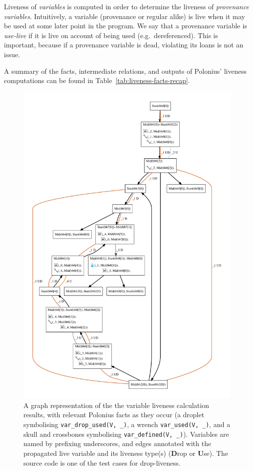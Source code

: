 \documentclass[11pt,a4paper,twoside,openany]{report}
\newcommand{\InDatalog}[1]{\texttt{#1}}
\begin{document}
Liveness of \emph{variables} is computed in order to determine the liveness of
\emph{provenance variables}. Intuitively, a variable (provenance or regular
alike) is live when it may be used at some later point in the program. We say
that a provenance variable is \textit{use-live} if it is live on account of
being used (e.g.\ dereferenced). This is important, because if a provenance
variable is dead, violating its loans is not an issue.

A summary of the facts, intermediate relations, and outputs of Polonius'
liveness computations can be found in Table~\ref{tab:liveness-facts-recap}.

\begin{figure}
  \includegraphics[width=0.9\linewidth]{Graphs/liveness.pdf}
  \caption[MIR Fragment with Inputs and Outputs of the Liveness Analysis]{A
    graph representation of the the variable liveness calculation results, with
    relevant Polonius facts as they occur (a droplet symbolising
    \InDatalog{var_drop_used(V, _)}, a wrench \InDatalog{var_used(V, _)}, and a
    skull and crossbones symbolising \InDatalog{var_defined(V, _)}). Variables
    are named by prefixing underscores, and edges annotated with the propagated
    live variable and its liveness type(s) (\textbf{D}rop or \textbf{U}se). The
    source code is one of the test cases for drop-liveness.}\label{fig:liveness-graph}
\end{figure}
\end{document}
